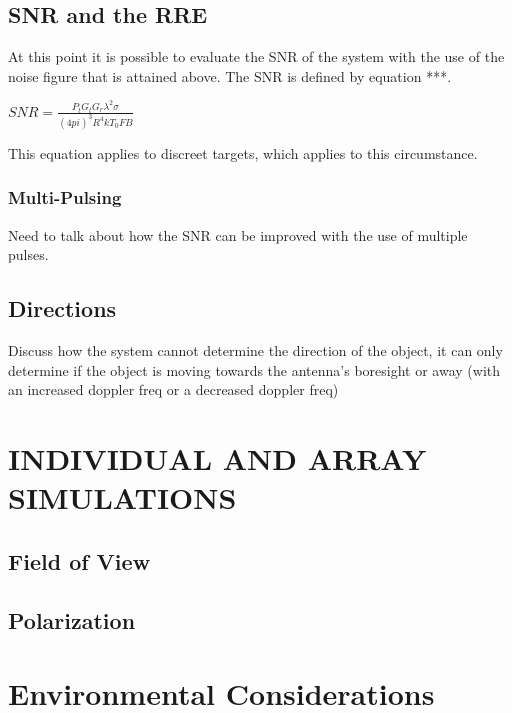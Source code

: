 \documentclass[11pt]{witseiepaper}
\begin{document}
\subsection{SNR and the RRE} \label{sec:SNRRRE}

At this point it is possible to evaluate the SNR of the system with the use of the noise figure that is attained above.
The SNR is defined by equation ***.

$SNR = \frac{P_{t} G_{t} G_{r} \lambda^2 \sigma}{(4 pi)^3 R^4 k T_0 F B}$

This equation applies to discreet targets, which applies to this circumstance.

\subsubsection{Multi-Pulsing} \label{sec:MultiPulsing}

Need to talk about how the SNR can be improved with the use of multiple pulses.

\subsection{Directions} \label{sec:Directions}

Discuss how the system cannot determine the direction of the object, it can only determine if the object is moving towards the antenna's boresight or away (with an increased doppler freq or a decreased doppler freq)

\section{INDIVIDUAL AND ARRAY SIMULATIONS} \label{sec:INDIVIDUALANDARRAYSIMULATIONS}

\subsection{Field of View} \label{sec:FieldOfView}

\subsection{Polarization} \label{sec:Polarization}


\section{Environmental Considerations} \label{sec:EnvironmentalConsiderations}
\end{document}
